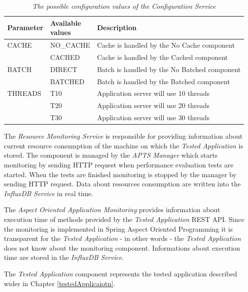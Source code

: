 \documentclass[10pt,a4paper]{article}
\begin{document}
\begin{table}[!htb]
\caption{\textit{The possible configuration values of the \textit{Configuration Service}}}\label{table:configurationvalues}
\begin{tabularx}{\textwidth}{p{1.6cm}|p{1.8cm}|X}
\textbf{Parameter} &\textbf{Available \newline values} & \textbf{Description} \\\hline
CACHE & NO\_CACHE & Cache is handled by the No Cache component\\\cline{2-3}
      & CACHED    & Cache is handled by the Cached component   \\ \hline
BATCH & DIRECT    & Batch is handled by the No Batched component   \\\cline{2-3}
	  & BATCHED   & Batch is handled by the Batched component   \\ \hline
THREADS & T10     & Application server will use 10 threads\\ \cline{2-3}
        & T20     & Application server will use 20 threads\\ \cline{2-3}
        & T30     & Application server will use 30 threads\\ \hline
\end{tabularx}
\end{table}	


The \textit{Resource Monitoring Service} is responsible for providing information about current resource consumption of the machine on which the \textit{Tested Application} is stored. The component is managed by the \textit{APTS Manager} which starts monitoring by sending HTTP request when performance evaluation tests are started. When the tests are finished monitoring is stopped by the manager by sending HTTP request. Data about resources consumption are written into the \textit{InfluxDB Service} in real time. 

The \textit{Aspect Oriented Application Monitoring} provides information about execution time of methods provided by the \textit{Tested Application} REST API. Since the monitoring is implemented in Spring Aspect Oriented Programming \cite{springaop} it is transparent for the \textit{Tested Application} - in other words - the \textit{Tested Application} does not know about the monitoring component. Informations about execution time are stored in the \textit{InfluxDB Service}.

The \textit{Tested Application} component represents the tested application described      wider in Chapter \ref{testedApplicaiotn}.
\end{document}
